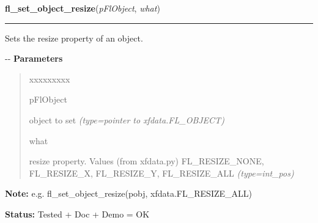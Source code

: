 \hspace{.8\funcindent}\begin{boxedminipage}{\funcwidth}

    \raggedright \textbf{fl\_set\_object\_resize}(\textit{pFlObject}, \textit{what})

    \vspace{-1.5ex}

    \rule{\textwidth}{0.5\fboxrule}
\setlength{\parskip}{2ex}

Sets the resize property of an object.

-{}-
\setlength{\parskip}{1ex}
      \textbf{Parameters}
      \vspace{-1ex}

      \begin{quote}
        \begin{Ventry}{xxxxxxxxx}

          \item[pFlObject]


object to set
            {\it (type=pointer to xfdata.FL\_OBJECT)}

          \item[what]


resize property. Values (from xfdata.py) FL\_RESIZE\_NONE,
FL\_RESIZE\_X, FL\_RESIZE\_Y, FL\_RESIZE\_ALL
            {\it (type=int\_pos)}

        \end{Ventry}

      \end{quote}

\textbf{Note:} 
e.g. fl\_set\_object\_resize(pobj, xfdata.FL\_RESIZE\_ALL)


\textbf{Status:} 
Tested + Doc + Demo = OK


    \end{boxedminipage}

    \label{xformslib:flbasic:fl_get_object_resize}

    \vspace{0.5ex}

